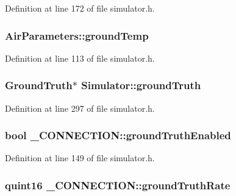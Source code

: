 Definition at line 172 of file simulator.\-h.

\hypertarget{group___h_i_t_l_plugin_gab28b8a30520fdf84e924254a8e7f0167}{
\subsubsection[{ground\-Temp}]{ Air\-Parameters\-::ground\-Temp}}\label{group___h_i_t_l_plugin_gab28b8a30520fdf84e924254a8e7f0167}


Definition at line 113 of file simulator.\-h.

\hypertarget{group___h_i_t_l_plugin_ga6c62059f6d424f96ad1142bfe8885e3a}{
\subsubsection[{ground\-Truth}]{\setlength{\rightskip}{0pt plus 5cm}Ground\-Truth$\ast$ Simulator\-::ground\-Truth\hspace{0.3cm}{\ttfamily [protected]}}}\label{group___h_i_t_l_plugin_ga6c62059f6d424f96ad1142bfe8885e3a}


Definition at line 297 of file simulator.\-h.

\hypertarget{group___h_i_t_l_plugin_ga7da92539dd2e9e4aeb94b848dc464b11}{
\subsubsection[{ground\-Truth\-Enabled}]{\setlength{\rightskip}{0pt plus 5cm}bool \-\_\-\-C\-O\-N\-N\-E\-C\-T\-I\-O\-N\-::ground\-Truth\-Enabled}}\label{group___h_i_t_l_plugin_ga7da92539dd2e9e4aeb94b848dc464b11}


Definition at line 149 of file simulator.\-h.

\hypertarget{group___h_i_t_l_plugin_ga46aa73f7e222771afe3b547bca31eacb}{
\subsubsection[{ground\-Truth\-Rate}]{\setlength{\rightskip}{0pt plus 5cm}quint16 \-\_\-\-C\-O\-N\-N\-E\-C\-T\-I\-O\-N\-::ground\-Truth\-Rate}}\label{group___h_i_t_l_plugin_ga46aa73f7e222771afe3b547bca31eacb}


